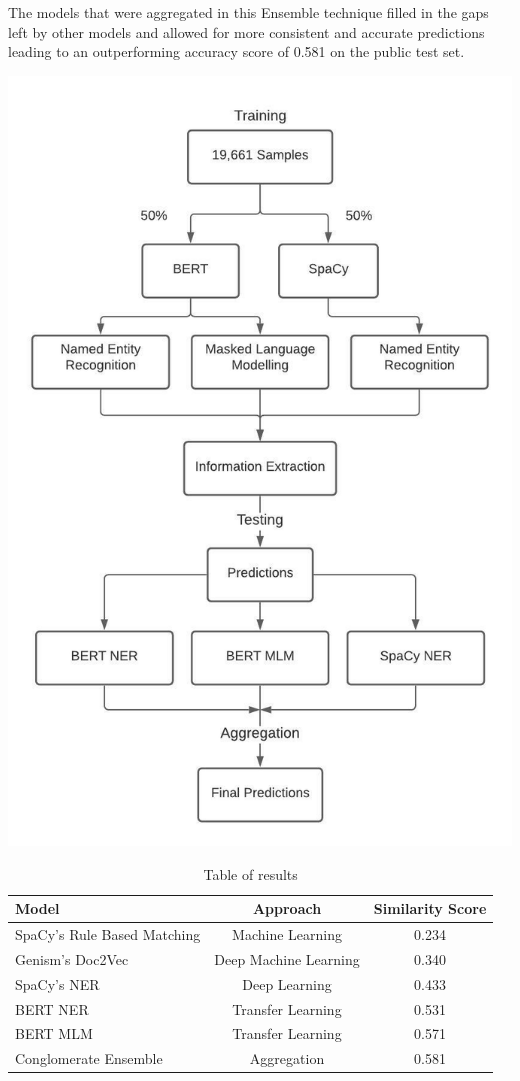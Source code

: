 \documentclass[twocolumn]{article}
\begin{document}
The models that were aggregated in this Ensemble technique filled in the gaps left by other models and allowed for more consistent and accurate predictions leading to an outperforming accuracy score of 0.581 on the public test set.

\begin{center}
\includegraphics[scale=0.6]{ensemble.jpeg}
\end{center}

\begin{table}[ht]
	\centering
	\begin{tabular}[t]{lcc}\\
		\toprule
		Model&Approach&Similarity Score\\
		\midrule
		SpaCy's Rule Based Matching&Machine Learning&0.234\\
		Genism's Doc2Vec&Deep Machine Learning&0.340\\
		SpaCy's NER&Deep Learning&0.433\\
		BERT NER&Transfer Learning&0.531\\
		BERT MLM&Transfer Learning&0.571\\
		Conglomerate Ensemble&Aggregation&0.581\\
		\bottomrule
	\end{tabular}
\caption{Table of results}
\end{table}%
\end{document}
